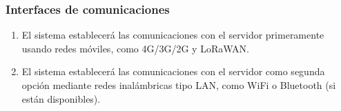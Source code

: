 \subsubsection{Interfaces de comunicaciones}
\begin{enumerate}[resume, label=\textbf{\texttt{RNF-\arabic*}}]
  \item\label{nf:mobile} El sistema establecerá las comunicaciones con el servidor
  primeramente usando redes móviles, como 4G/3G/2G y LoRaWAN.
  \item\label{nf:wifi} El sistema establecerá las comunicaciones con el servidor
  como segunda opción mediante redes inalámbricas tipo LAN, como WiFi o Bluetooth
  (si están disponibles).
\end{enumerate}